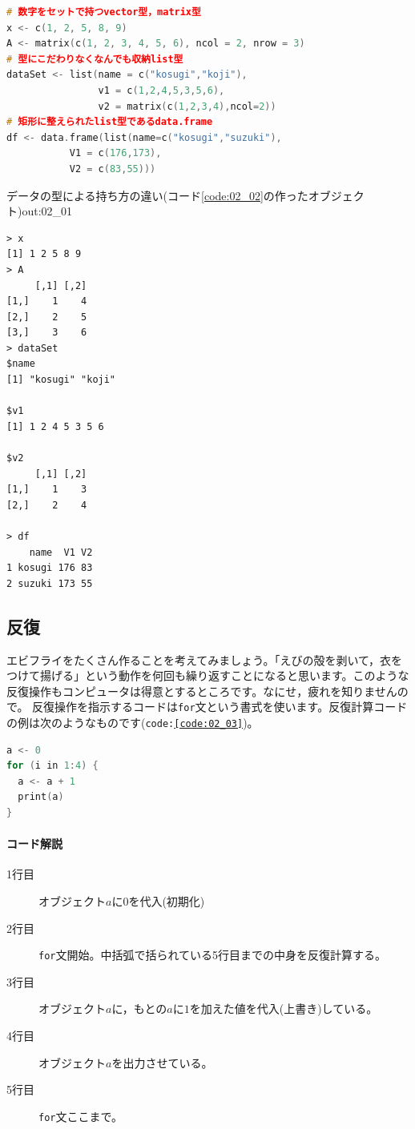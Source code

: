 \documentclass{ltjsbook}
\begin{document}
\begin{lstlisting}[language=c++,label={code:02_02},caption={さまざまなデータの型}]
# 数字をセットで持つvector型，matrix型
x <- c(1, 2, 5, 8, 9)
A <- matrix(c(1, 2, 3, 4, 5, 6), ncol = 2, nrow = 3)
# 型にこだわりなくなんでも収納list型
dataSet <- list(name = c("kosugi","koji"),
                v1 = c(1,2,4,5,3,5,6),
                v2 = matrix(c(1,2,3,4),ncol=2))
# 矩形に整えられたlist型であるdata.frame
df <- data.frame(list(name=c("kosugi","suzuki"),
           V1 = c(176,173),
           V2 = c(83,55)))
\end{lstlisting}

\begin{Rscreen}{データの型による持ち方の違い(コード\ref{code:02_02}の作ったオブジェクト)}{out:02_01}
	\begin{verbatim}
> x
[1] 1 2 5 8 9
> A
     [,1] [,2]
[1,]    1    4
[2,]    2    5
[3,]    3    6
> dataSet
$name
[1] "kosugi" "koji"  

$v1
[1] 1 2 4 5 3 5 6

$v2
     [,1] [,2]
[1,]    1    3
[2,]    2    4

> df
    name  V1 V2
1 kosugi 176 83
2 suzuki 173 55\end{verbatim}
\end{Rscreen}


\subsection{反復}
エビフライをたくさん作ることを考えてみましょう。「えびの殻を剥いて，衣をつけて揚げる」という動作を何回も繰り返すことになると思います。このような反復操作もコンピュータは得意とするところです。なにせ，疲れを知りませんので。
反復操作を指示するコードは\texttt{for}文という書式を使います。反復計算コードの例は次のようなものです(\texttt{code:\ref{code:02_03}})。

\begin{lstlisting}[language=c++,label={code:02_03},caption={反復操作1}]
a <- 0
for (i in 1:4) {
  a <- a + 1
  print(a)
}
\end{lstlisting}

\paragraph{コード解説}
\begin{description}
	\item[1行目] オブジェクト$a$に$0$を代入(初期化)
	\item[2行目] \texttt{for}文開始。中括弧で括られている5行目までの中身を反復計算する。
	\item[3行目] オブジェクト$a$に，もとの$a$に$1$を加えた値を代入(上書き)している。
	\item[4行目] オブジェクト$a$を出力させている。
	\item[5行目] \texttt{for}文ここまで。
\end{description}
\end{document}
